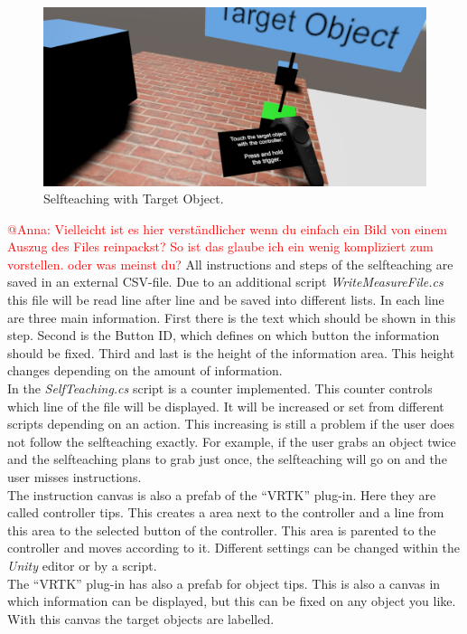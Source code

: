 \begin{figure}[H] 
	\center 
	\includegraphics[width=12cm]{Images/teaching3.PNG}
	\caption[Selfteaching with Target Object.]{Selfteaching with Target Object.}
	\label{fig:teaching3}
\end{figure}


\textcolor{red}{@Anna: Vielleicht ist es hier verständlicher wenn du einfach ein Bild von einem Auszug des Files reinpackst? So ist das glaube ich ein wenig kompliziert zum vorstellen. oder was meinst du?}
All instructions and steps of the selfteaching are saved in an external CSV-file. Due to an additional script \textit{WriteMeasureFile.cs} this file will be read line after line and be saved into different lists. In each line are three main information. First there is the text which should be shown in this step. Second is the Button ID, which defines on which button the information should be fixed. Third and last is the height of the information area. This height changes depending on the amount of information. \\
In the \textit{SelfTeaching.cs }script is a counter implemented. This counter controls which line of the file will be displayed. It will be increased or set from different scripts depending on an action. This increasing is still a problem if the user does not follow the selfteaching exactly. For example, if the user grabs an object twice and the selfteaching plans to grab just once, the selfteaching will go on and the user misses instructions. \\
The instruction canvas is also a prefab of the ``VRTK'' plug-in. Here they are called controller tips. This creates a area next to the controller and a line from this area to the selected button of the controller. This area is parented to the controller and moves according to it. Different settings can be changed within the \textit{Unity} editor or by a script.\\
The ``VRTK'' plug-in has also a prefab for object tips. This is also a canvas in which information can be displayed, but this can be fixed on any object you like. With this canvas the target objects are labelled.


\newpage